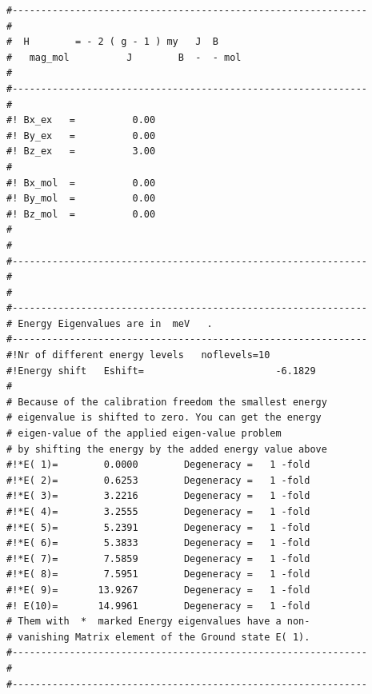 \begin{enumerate}
{\begin{verbatim}
#--------------------------------------------------------------
#                                                              
#  H        = - 2 ( g - 1 ) my   J  B                          
#   mag_mol          J        B  -  - mol                      
#                                                              
#--------------------------------------------------------------
#                                                              
#! Bx_ex   =          0.00                                     
#! By_ex   =          0.00                                     
#! Bz_ex   =          3.00                                     
#                                                              
#! Bx_mol  =          0.00                                     
#! By_mol  =          0.00                                     
#! Bz_mol  =          0.00                                     
#                                                              
#                                                              
#-------------------------------------------------------------- 
#
#
#-------------------------------------------------------------- 
# Energy Eigenvalues are in  meV   .          	            
#--------------------------------------------------------------
#!Nr of different energy levels   noflevels=10                 
#!Energy shift   Eshift=                       -6.1829 
#                                                              
# Because of the calibration freedom the smallest energy       
# eigenvalue is shifted to zero. You can get the energy        
# eigen-value of the applied eigen-value problem               
# by shifting the energy by the added energy value above       
#!*E( 1)=        0.0000        Degeneracy =   1 -fold            
#!*E( 2)=        0.6253        Degeneracy =   1 -fold            
#!*E( 3)=        3.2216        Degeneracy =   1 -fold            
#!*E( 4)=        3.2555        Degeneracy =   1 -fold            
#!*E( 5)=        5.2391        Degeneracy =   1 -fold            
#!*E( 6)=        5.3833        Degeneracy =   1 -fold            
#!*E( 7)=        7.5859        Degeneracy =   1 -fold            
#!*E( 8)=        7.5951        Degeneracy =   1 -fold            
#!*E( 9)=       13.9267        Degeneracy =   1 -fold            
#! E(10)=       14.9961        Degeneracy =   1 -fold            
# Them with  *  marked Energy eigenvalues have a non-          
# vanishing Matrix element of the Ground state E( 1).          
#-------------------------------------------------------------- 
#
#-------------------------------------------------------------- 

\end{verbatim}}
\end{enumerate}
